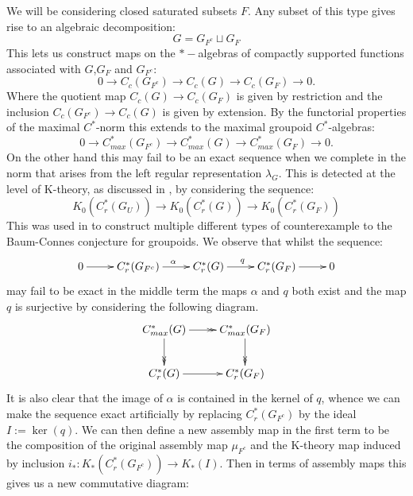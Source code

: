 \documentclass[11pt]{amsart}
\theoremstyle{plain}
\theoremstyle{definition}%
\theoremstyle{remark}%
\begin{document}
We will be considering closed saturated subsets $F$. Any subset of this type gives rise to an algebraic decomposition:
\begin{equation*}
G = G_{F^{c}}\sqcup G_{F}
\end{equation*}
This lets us construct maps on the $*-$algebras of compactly supported functions associated with $G$,$G_{F}$ and $G_{F^{c}}$:
\begin{equation*}
0 \rightarrow C_{c}(G_{F^{c}}) \rightarrow C_{c}(G) \rightarrow C_{c}(G_{F}) \rightarrow 0.
\end{equation*}
Where the quotient map $C_{c}(G) \rightarrow C_{c}(G_{F})$ is given by restriction and the inclusion $C_{c}(G_{F^{c}}) \rightarrow C_{c}(G)$ is given by extension. By the functorial properties of the maximal $C^{*}$-norm this extends to the maximal groupoid $C^{*}$-algebras:
\begin{equation*}
0 \rightarrow C_{max}^{*}(G_{F^{c}}) \rightarrow C_{max}^{*}(G) \rightarrow C_{max}^{*}(G_{F}) \rightarrow 0.
\end{equation*}
On the other hand this may fail to be an exact sequence when we complete in the norm that arises from the left regular representation $\lambda_{G}$. This is detected at the level of K-theory, as discussed in \cite{MR1911663}, by considering the sequence:
\begin{equation}\label{eqn:neim}
K_{0}(C^{*}_{r}(G_{U}))\rightarrow K_{0}(C^{*}_{r}(G)) \rightarrow K_{0}(C^{*}_{r}(G_{F}))
\end{equation}
This was used in \cite{MR1911663} to construct multiple different types of counterexample to the Baum-Connes conjecture for groupoids. We observe that whilst the sequence:
\begin{equation*}
\xymatrix{
0 \ar[r] & C_{r}^{*}(G_{F^{c}}) \ar[r]^{\alpha}& C_{r}^{*}(G) \ar[r]^{q} & C_{r}^{*}(G_{F}) \ar[r] & 0
}
\end{equation*}
may fail to be exact in the middle term the maps $\alpha$ and $q$ both exist and the map $q$ is surjective by considering the following diagram.
\begin{equation*}
\xymatrix{C^{*}_{max}(G) \ar@{->>}[r] \ar@{->>}[d] & C^{*}_{max}(G_{F}) \ar@{->>}[d]\\
C^{*}_{r}(G)\ar@{->}[r] &   C^{*}_{r}(G_{F})
}
\end{equation*}
It is also clear that the image of $\alpha$ is contained in the kernel of $q$, whence we can make the sequence exact artificially by replacing $C_{r}^{*}(G_{F^{c}})$ by the ideal $I:=\ker(q)$. We can then define a new assembly map in the first term to be the composition of the original assembly map $\mu_{F^{c}}$ and the K-theory map induced by inclusion $i_{*}:K_{*}(C^{*}_{r}(G_{F^{c}})) \rightarrow K_{*}(I)$. Then in terms of assembly maps this gives us a new commutative diagram:
\end{document}
